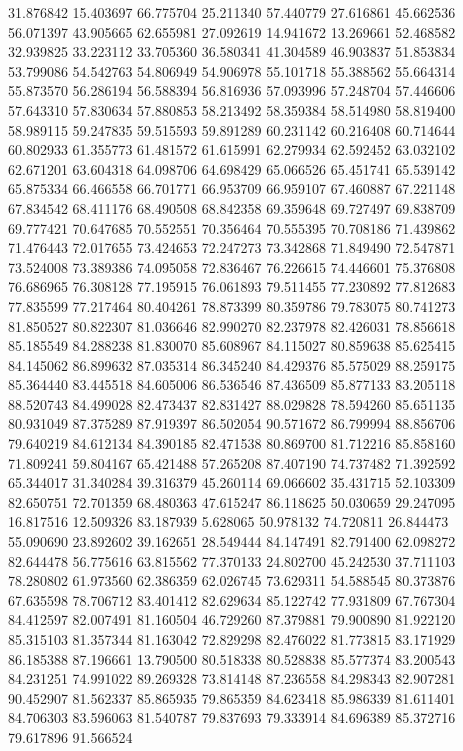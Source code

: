 31.876842
15.403697
66.775704
25.211340
57.440779
27.616861
45.662536
56.071397
43.905665
62.655981
27.092619
14.941672
13.269661
52.468582
32.939825
33.223112
33.705360
36.580341
41.304589
46.903837
51.853834
53.799086
54.542763
54.806949
54.906978
55.101718
55.388562
55.664314
55.873570
56.286194
56.588394
56.816936
57.093996
57.248704
57.446606
57.643310
57.830634
57.880853
58.213492
58.359384
58.514980
58.819400
58.989115
59.247835
59.515593
59.891289
60.231142
60.216408
60.714644
60.802933
61.355773
61.481572
61.615991
62.279934
62.592452
63.032102
62.671201
63.604318
64.098706
64.698429
65.066526
65.451741
65.539142
65.875334
66.466558
66.701771
66.953709
66.959107
67.460887
67.221148
67.834542
68.411176
68.490508
68.842358
69.359648
69.727497
69.838709
69.777421
70.647685
70.552551
70.356464
70.555395
70.708186
71.439862
71.476443
72.017655
73.424653
72.247273
73.342868
71.849490
72.547871
73.524008
73.389386
74.095058
72.836467
76.226615
74.446601
75.376808
76.686965
76.308128
77.195915
76.061893
79.511455
77.230892
77.812683
77.835599
77.217464
80.404261
78.873399
80.359786
79.783075
80.741273
81.850527
80.822307
81.036646
82.990270
82.237978
82.426031
78.856618
85.185549
84.288238
81.830070
85.608967
84.115027
80.859638
85.625415
84.145062
86.899632
87.035314
86.345240
84.429376
85.575029
88.259175
85.364440
83.445518
84.605006
86.536546
87.436509
85.877133
83.205118
88.520743
84.499028
82.473437
82.831427
88.029828
78.594260
85.651135
80.931049
87.375289
87.919397
86.502054
90.571672
86.799994
88.856706
79.640219
84.612134
84.390185
82.471538
80.869700
81.712216
85.858160
71.809241
59.804167
65.421488
57.265208
87.407190
74.737482
71.392592
65.344017
31.340284
39.316379
45.260114
69.066602
35.431715
52.103309
82.650751
72.701359
68.480363
47.615247
86.118625
50.030659
29.247095
16.817516
12.509326
83.187939
5.628065
50.978132
74.720811
26.844473
55.090690
23.892602
39.162651
28.549444
84.147491
82.791400
62.098272
82.644478
56.775616
63.815562
77.370133
24.802700
45.242530
37.711103
78.280802
61.973560
62.386359
62.026745
73.629311
54.588545
80.373876
67.635598
78.706712
83.401412
82.629634
85.122742
77.931809
67.767304
84.412597
82.007491
81.160504
46.729260
87.379881
79.900890
81.922120
85.315103
81.357344
81.163042
72.829298
82.476022
81.773815
83.171929
86.185388
87.196661
13.790500
80.518338
80.528838
85.577374
83.200543
84.231251
74.991022
89.269328
73.814148
87.236558
84.298343
82.907281
90.452907
81.562337
85.865935
79.865359
84.623418
85.986339
81.611401
84.706303
83.596063
81.540787
79.837693
79.333914
84.696389
85.372716
79.617896
91.566524
